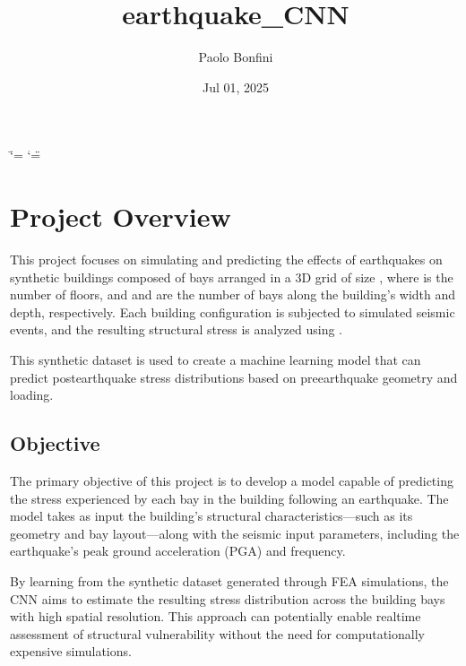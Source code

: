 \documentclass[letterpaper,10pt,english]{sphinxmanual}
\title{earthquake\_CNN}
\date{Jul 01, 2025}
\author{Paolo Bonfini}
\begin{document}
\ifdefined\shorthandoff
  \ifnum\catcode`\=\string=\active\shorthandoff{=}\fi
  \ifnum\catcode`\"=\active{}\fi
\fi

\pagestyle{empty}
\sphinxmaketitle
\pagestyle{plain}
\sphinxtableofcontents
\pagestyle{normal}
\label{\detokenize{index::doc}}


\sphinxstepscope


\chapter{Project Overview}
\label{\detokenize{overview:project-overview}}\label{\detokenize{overview:overview-section}}\label{\detokenize{overview::doc}}
\sphinxAtStartPar
This project focuses on simulating and predicting the effects of earthquakes
on synthetic buildings composed of bays arranged in a 3D grid of size
, where  is the number of floors, and  and  are the
number of bays along the building’s width and depth, respectively.
Each building configuration is subjected to simulated seismic events, and the
resulting structural stress is analyzed using .

\sphinxAtStartPar
This synthetic dataset is used to create a machine learning model that can
predict post\sphinxhyphen{}earthquake stress distributions based on pre\sphinxhyphen{}earthquake geometry
and loading.


\section{Objective}
\label{\detokenize{overview:objective}}
\sphinxAtStartPar
The primary objective of this project is to develop a 
model capable of predicting the stress experienced by each bay in the building
following an earthquake.
The model takes as input the building’s structural characteristics—such as its
geometry and bay layout—along with the seismic input parameters, including the
earthquake’s peak ground acceleration (PGA) and frequency.

\sphinxAtStartPar
By learning from the synthetic dataset generated through FEA simulations, the
CNN aims to estimate the resulting stress distribution across the building bays
with high spatial resolution.
This approach can potentially enable real\sphinxhyphen{}time assessment of structural vulnerability
without the need for computationally expensive simulations.
\end{document}
